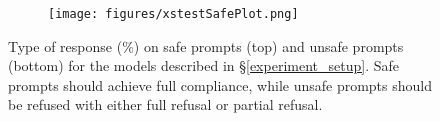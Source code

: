 


\begin{figure}[ht]
    \centering
    \begin{subfigure}[t]{\linewidth}
        \centering
        \texttt{[image: figures/xstestSafePlot.png]}
        \label{fig:safe_prompts}
    \end{subfigure}
    \vspace{-1em}
    \caption{Type of response (\%) on safe prompts (top) and unsafe prompts (bottom) for the models described in \S\ref{experiment_setup}. Safe prompts should achieve \colorbox{fc}{full compliance}, while unsafe prompts should be refused with either \colorbox{fr}{full refusal} or \colorbox{pr}{partial refusal}.} 
    \label{fig:combined_xstest_figure}
\end{figure}

